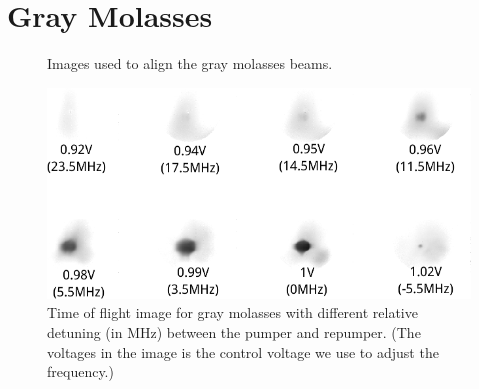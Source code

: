 \section{Gray Molasses}\label{exp:gm}
\begin{figure}
  \begin{center}
  \end{center}
  \caption{Images used to align the gray molasses beams.}
  \label{exp:gm-align}
\end{figure}
\begin{figure}
  \begin{center}
    \includegraphics[width=14cm]{gm-ddet.png}
  \end{center}
  \caption{Time of flight image for gray molasses with different relative detuning (in MHz) between the pumper and repumper. (The voltages in the image is the control voltage we use to adjust the frequency.)}
  \label{exp:gm-ddet}
\end{figure}
